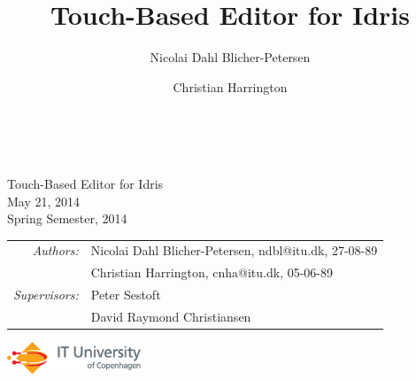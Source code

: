 \documentclass[a4paper,11pt]{report}
\begin{document}
\title{Touch-Based Editor for Idris}
\author{Nicolai Dahl Blicher-Petersen \and Christian Harrington \\
}


\begin{titlepage}
\ \\
\vspace{3cm}
\begin{center}
{\huge\sffamily
Touch-Based Editor for Idris
\\}\bigskip
{\large\sffamily
May 21, 2014
\\}
{\sffamily Spring Semester, 2014}
\end{center}
\vspace{3cm}
\large
\begin{center}
\begin{tabular}{r@{  }l}
\emph{\sffamily Authors:} & \textsf{Nicolai Dahl Blicher-Petersen, ndbl@itu.dk, 27-08-89}\\
 & \textsf{Christian Harrington, cnha@itu.dk, 05-06-89}\\
\emph{\sffamily Supervisors:} & \textsf{Peter Sestoft} \\
 & \textsf{David Raymond Christiansen}
\end{tabular}
\end{center}
\vfill
\includegraphics[width=4cm]{ITU_logo_ENG_horisontal}
\end{titlepage}

\end{document}
